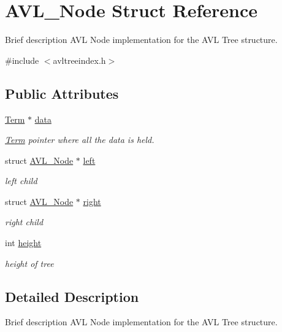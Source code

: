 \hypertarget{struct_a_v_l___node}{}\section{A\+V\+L\+\_\+\+Node Struct Reference}
\label{struct_a_v_l___node}


Brief description A\+V\+L Node implementation for the A\+V\+L Tree structure.  




{\ttfamily \#include $<$avltreeindex.\+h$>$}

\subsection*{Public Attributes}
\begin{DoxyCompactItemize}
\item 
\hyperlink{class_term}{Term} $\ast$ \hyperlink{struct_a_v_l___node_a6a9062cc45fa099a2c68763e1d52b894}{data}
\begin{DoxyCompactList}\small\item\em \hyperlink{class_term}{Term} pointer where all the data is held. \end{DoxyCompactList}\item 
struct \hyperlink{struct_a_v_l___node}{A\+V\+L\+\_\+\+Node} $\ast$ \hyperlink{struct_a_v_l___node_a7a5a4e3c99ef2c11b20a6a60aee247a8}{left}
\begin{DoxyCompactList}\small\item\em left child \end{DoxyCompactList}\item 
struct \hyperlink{struct_a_v_l___node}{A\+V\+L\+\_\+\+Node} $\ast$ \hyperlink{struct_a_v_l___node_af0d0c4d5eaf62a9141711d1a10e3ba11}{right}
\begin{DoxyCompactList}\small\item\em right child \end{DoxyCompactList}\item 
int \hyperlink{struct_a_v_l___node_a802b8e700879b7489730140f5e1fd121}{height}
\begin{DoxyCompactList}\small\item\em height of tree \end{DoxyCompactList}\end{DoxyCompactItemize}


\subsection{Detailed Description}
Brief description A\+V\+L Node implementation for the A\+V\+L Tree structure. 

